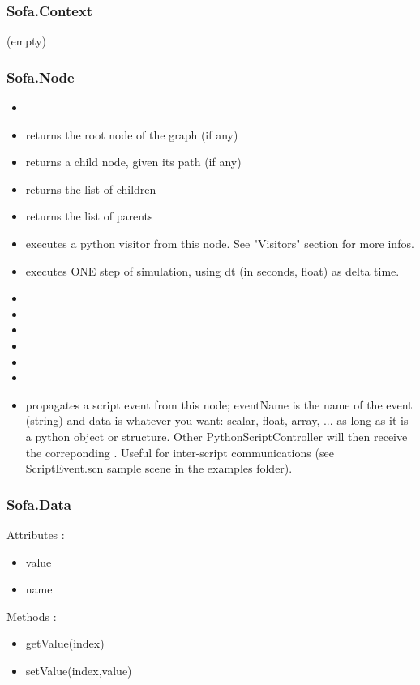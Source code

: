 \subsubsection{Sofa.Context}
(empty)
\subsubsection{Sofa.Node}
\begin{itemize}
\item {} 
\item {} returns the root node of the graph (if any) 
\item {} returns a child node, given its path (if any) 
\item {} returns the list of children 
\item {} returns the list of parents
\item {} executes a python visitor from this node. See "Visitors" section for more infos.
\item {} executes ONE step of simulation, using dt (in seconds, float) as delta time. 
\item {} 
\item {} 
\item {} 
\item {} 
\item {} 
\item {} 
\item {} propagates a script event from this node; eventName is the name of the event (string) and data is whatever you want: scalar, float, array, ... as long as it is a python object or structure. Other PythonScriptController will then receive the correponding . Useful for inter-script communications (see ScriptEvent.scn sample scene in the examples folder).
\end{itemize}


\subsubsection{Sofa.Data}
Attributes :
\begin{itemize}
\item value
\item name
\end{itemize}
Methods :
\begin{itemize}
\item getValue(index)
\item setValue(index,value)
\end{itemize}

